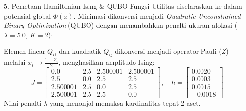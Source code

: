 \begin{frame}{5. Pemetaan Hamiltonian Ising \& QUBO}
Fungsi Utilitas diselaraskan ke dalam potensial global $\Phi(x)$. Minimasi dikonversi menjadi \textit{Quadratic Unconstrained Binary Optimization} (QUBO) dengan menambahkan penalti ukuran alokasi ($\lambda = 5.0$, $K=2$):

Elemen linear $Q_{ii}$ dan kuadratik $Q_{ij}$ dikonversi menjadi operator Pauli ($Z$) melalui $x_i \to \frac{1-Z_i}{2}$, menghasilkan amplitudo Ising:
$$ J = 
\begin{bmatrix}
0.0 & 2.5 & 2.500001 & 2.500001 \\
2.5 & 0.0 & 2.5 & 2.5 \\
2.500001 & 2.5 & 0.0 & 2.5 \\
2.500001 & 2.5 & 2.5 & 0.0
\end{bmatrix}
, \quad h = 
\begin{bmatrix}
0.0020 \\ 0.0003 \\ 0.0015 \\ -0.0018
\end{bmatrix}
$$
Nilai penalti $\lambda$ yang menonjol memaksa kardinalitas tepat 2 aset.
\end{frame}
